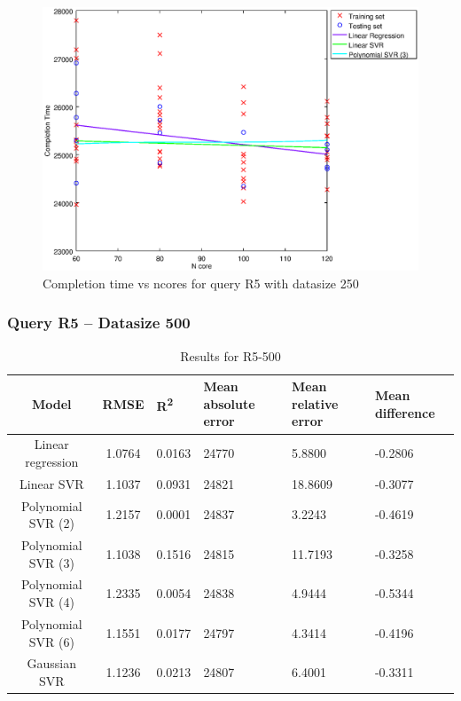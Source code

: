 \documentclass[a4paper,11pt]{article}
\begin{document}
\begin {figure}[hbtp]
\centering
\includegraphics[width=\textwidth]{output/R5_250_ONLY_1_LINEAR_NCORE/plot_R5_250_bestmodels.eps}
\caption{Completion time vs ncores for query R5 with datasize 250}
\label{fig:coreonly_linear_R5_250}
\end {figure}

\newpage
\subsubsection{Query R5 -- Datasize 500}
\begin{table}[H]
	\centering
	\begin{adjustbox}{center}
		\begin{tabular}{c | c M{1.2cm} M{2.5cm} M{2.5cm} M{1.8cm}}
			Model & RMSE & R\textsuperscript{2} & Mean absolute error & Mean relative error & Mean difference \tabularnewline
			\hline
			Linear regression & 1.0764 & 0.0163 &  24770 & 5.8800 & -0.2806 \\
			Linear SVR & 1.1037 & 0.0931 &  24821 & 18.8609 & -0.3077 \\
			Polynomial SVR (2) & 1.2157 & 0.0001 &  24837 & 3.2243 & -0.4619 \\
			Polynomial SVR (3) & 1.1038 & 0.1516 &  24815 & 11.7193 & -0.3258 \\
			Polynomial SVR (4) & 1.2335 & 0.0054 &  24838 & 4.9444 & -0.5344 \\
			Polynomial SVR (6) & 1.1551 & 0.0177 &  24797 & 4.3414 & -0.4196 \\
			Gaussian SVR & 1.1236 & 0.0213 &  24807 & 6.4001 & -0.3311 \\
		\end{tabular}
	\end{adjustbox}
	\\
	\caption{Results for R5-500}
	\label{fig:coreonly_linear_R5_500}
\end{table}
\end{document}
